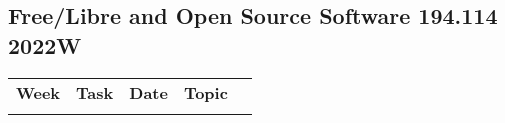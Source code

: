 \documentclass[a4paper]{article}
\def\mytitle{Free/Libre and Open Source Software 194.114 2022W}
\begin{document}

\begin{center}
  \section*{\mytitle}
\end{center}
\thispagestyle{fancy}

% 

\begin{longtable}{@{}ll@{~~}rlr@{}}
\textbf{Week} & \textbf{Task} & \textbf{Date} & \textbf{Topic} \\
\\[-2.1ex]

\end{longtable}


\doclicenseThis
\end{document}
